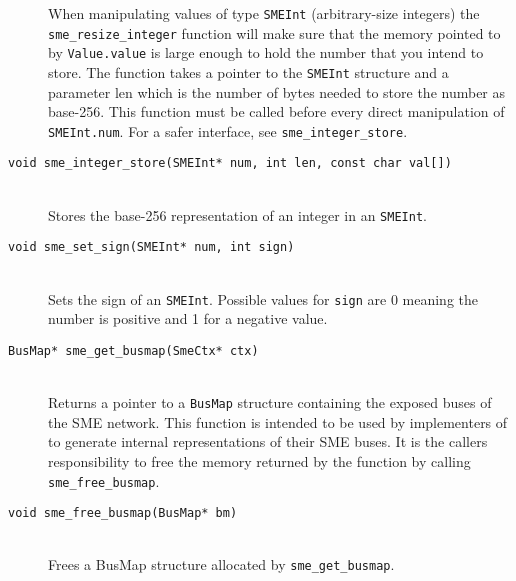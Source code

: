\begin{description}
   When manipulating values of type {\tt SMEInt} (arbitrary-size integers) the
   \texttt{sme_resize_integer} function will make sure that the memory pointed
   to by {\tt Value.value} is large enough to hold the number that you intend to
   store. The function takes a pointer to the {\tt SMEInt} structure and a
   parameter len which is the number of bytes needed to store the number as
   base-256. This function must be called before every direct manipulation of
   {\tt SMEInt.num}. For a safer interface, see \texttt{sme_integer_store}.
 \item[\texttt{void sme_integer_store(SMEInt* num, int len, const char val[])}]\hfill\\
   Stores the base-256 representation of an integer in an \texttt{SMEInt}.
 \item[\texttt{void sme_set_sign(SMEInt* num, int sign)}]\hfill\\
   Sets the sign of an \texttt{SMEInt}. Possible values for \texttt{sign} are 0
   meaning the number is positive and 1 for a negative value.
 \item[\texttt{BusMap* sme_get_busmap(SmeCtx* ctx)}]\hfill\\
   Returns a pointer to a {\tt BusMap} structure containing the exposed buses of
   the SME network. This function is intended to be used by implementers of
   \libsme{} to generate internal representations of their SME buses. It is the
   callers responsibility to free the memory returned by the function by calling
   \texttt{sme_free_busmap}.
\item[\texttt{void sme_free_busmap(BusMap* bm)}]\hfill\\
   Frees a BusMap structure allocated by \texttt{sme_get_busmap}.
\end{description}

